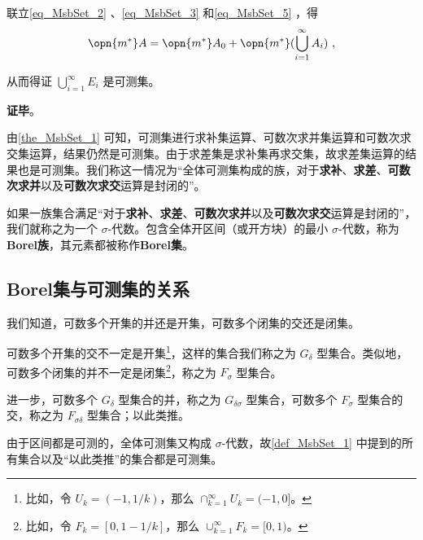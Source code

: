 联立\autoref{eq_MsbSet_2} 、\autoref{eq_MsbSet_3} 和\autoref{eq_MsbSet_5} ，得
\begin{equation}
\opn{m^*}A=\opn{m^*}A_0+\opn{m^*}(\bigcup_{i=1}^\infty A_i)~,
\end{equation}

从而得证 $\bigcup_{i=1}^\infty E_i$ 是可测集。




\textbf{证毕}。


由\autoref{the_MsbSet_1} 可知，可测集进行求补集运算、可数次求并集运算和可数次求交集运算，结果仍然是可测集。由于求差集是求补集再求交集，故求差集运算的结果也是可测集。我们称这一情况为“全体可测集构成的族，对于\textbf{求补}、\textbf{求差}、\textbf{可数次求并}以及\textbf{可数次求交}运算是封闭的”。

\begin{definition}{}
如果一族集合满足“对于\textbf{求补}、\textbf{求差}、\textbf{可数次求并}以及\textbf{可数次求交}运算是封闭的”，我们就称之为一个 $\sigma$-代数。包含全体开区间（或开方块）的最小 $\sigma$-代数，称为\textbf{Borel族}，其元素都被称作\textbf{Borel集}。
\end{definition}


\subsection{Borel集与可测集的关系}

\begin{definition}{}

我们知道，可数多个开集的并还是开集，可数多个闭集的交还是闭集。

可数多个开集的交不一定是开集\footnote{比如，令 $U_k=(-1, 1/k)$，那么 $\cap_{k=1}^\infty U_k=(-1, 0]$。}，这样的集合我们称之为 $G_\delta$ 型集合\cite{十一五实变函数论}。类似地，可数多个闭集的并不一定是闭集\footnote{比如，令 $F_k=[0, 1-1/k]$，那么 $\cup_{k=1}^\infty F_k=[0, 1)$。}，称之为 $F_\sigma$ 型集合。

进一步，可数多个 $G_\delta$ 型集合的并，称之为 $G_{\delta\sigma}$ 型集合，可数多个 $F_\sigma$ 型集合的交，称之为 $F_{\sigma\delta}$ 型集合；以此类推。

\end{definition}

由于区间都是可测的，全体可测集又构成 $\sigma$-代数，故\autoref{def_MsbSet_1} 中提到的所有集合以及“以此类推”的集合都是可测集。




